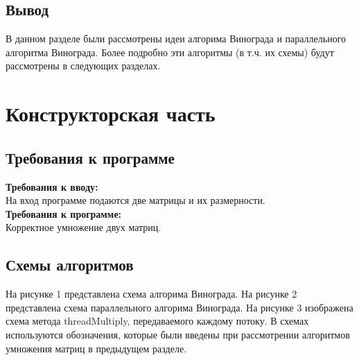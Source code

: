 \documentclass[a4paper,14pt]{report}
\begin{document}
\section*{Вывод}
В данном разделе были рассмотрены идеи алгорима Винограда и параллельного алгоритма Винограда. Более подробно эти алгоритмы (в т.ч. их схемы) будут рассмотрены в следующих разделах.

\chapter*{Конструкторская часть}

\section*{Требования к программе}

\textbf{Требования к вводу:}\\
На вход программе подаются две матрицы и их размерности.\\

\textbf{Требования к программе:}\\
Корректное умножение двух матриц.\\

\section*{Схемы алгоритмов}

На рисунке 1 представлена схема алгорима Винограда. На рисунке 2 представлена схема параллельного алгорима Винограда. На рисунке 3 изображена схема метода threadMultiply, передаваемого каждому потоку. В схемах используются обозначения, которые были введены при рассмотрении алгоритмов умножения матриц в предыдущем разделе.
\end{document}
